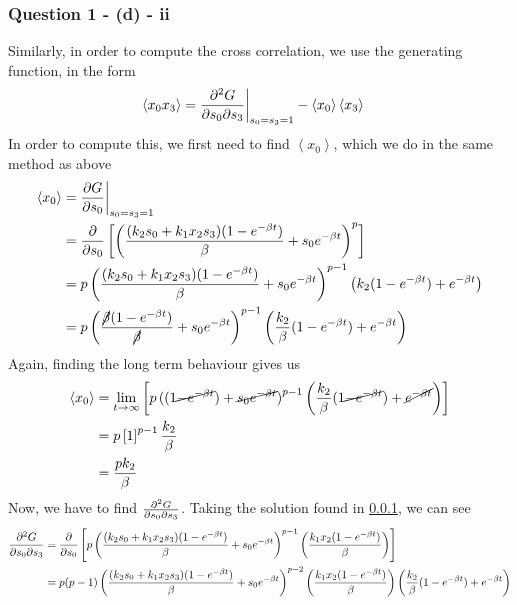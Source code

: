 \documentclass[11pt,a4paper]{article}
\begin{document}
\subsubsection{Question 1 - (d) - ii}
\label{sec:question1:subsec:partd:subsub:ii}
Similarly, in order to compute the cross correlation, we use the generating function, in the form 
\begin{align*}
\left\langle x_0 x_3 \right\rangle &= \pdv{G}{s_0}{s_3} \bigg\rvert_{s_0=s_3=1} - \left\langle x_0 \right\rangle \left\langle x_3 \right\rangle
\end{align*}
In order to compute this, we first need to find $\left\langle x_0 \right\rangle$, which we do in the same method as above
\begin{align*}
\left\langle x_0 \right\rangle &= \pdv{G}{s_0}\bigg\rvert_{s_0=s_3=1} \\
&= \pdv{s_0} \left[ \left( \frac{(k_2 s_0 + k_1 x_2 s_3) (1- e^{-\beta t} )}{\beta} + s_0 e^{-\beta t} \right)^p \right] \\
&= p \left( \frac{(k_2 s_0 + k_1 x_2 s_3) (1- e^{-\beta t} )}{\beta} + s_0 e^{-\beta t} \right)^{p-1} \left( k_2 (1-e^{-\beta t}) + e^{-\beta t} \right) \\
&= p \left( \frac{\cancel{\beta} (1- e^{-\beta t} )}{\cancel{\beta}} + s_0 e^{-\beta t} \right)^{p-1} \left( \frac{k_2}{\beta} (1-e^{-\beta t}) + e^{-\beta t} \right) 
\end{align*}
Again, finding the long term behaviour gives us 
\begin{align*}
\left\langle x_0 \right\rangle &= \lim_{t\rightarrow \infty} \left[ p \left((1 \cancel{- e^{-\beta t}} ) + \cancel{s_0 e^{-\beta t}} \right)^{p-1} \left( \frac{k_2}{\beta} (1\cancel{-e^{-\beta t}}) + \cancel{e^{-\beta t}} \right) \right] \\
&= p \left[1\right]^{p-1} \frac{k_2}{\beta} \\
&= \frac{p k_2}{\beta} 
\end{align*}
Now, we have to find $\pdv{G}{s_0}{s_3}$. Taking the solution found in \ref{sec:question1:subsec:partd:subsub:ii}, we can see
\begin{align*}
\pdv{G}{s_0}{s_3} &= \pdv{s_0} \left[p \left( \frac{(k_2 s_0 + k_1 x_2 s_3) (1- e^{-\beta t} )}{\beta} + s_0 e^{-\beta t} \right)^{p-1} \left(\frac{k_1 x_2 (1 - e^{-\beta t} ) }{\beta}\right) \right] \\ 
&= p (p-1) \left( \frac{(k_2 s_0 + k_1 x_2 s_3) (1- e^{-\beta t} )}{\beta} + s_0 e^{-\beta t} \right)^{p-2} \left(\frac{k_1 x_2 (1 - e^{-\beta t} ) }{\beta}\right) \left(\frac{k_2}{\beta} (1 - e^{-\beta t}) + e^{-\beta t} \right) 
\end{align*}
\end{document}
